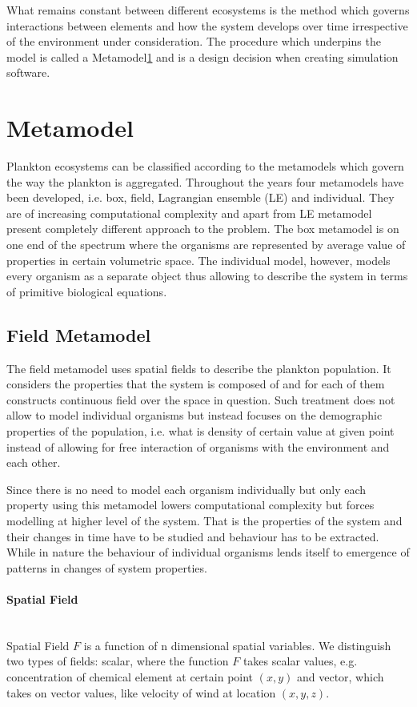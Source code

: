 \documentclass[12pt, a4paper]{report}
\newcommand{\myparagraph}[1]{\paragraph{#1}\mbox{}\\}
\begin{document}
What remains constant between different ecosystems is the method which governs interactions
between elements and how the system develops over time irrespective of the environment
under consideration. The procedure which underpins the model is called a Metamodel\ref{sec:meta}
and is a design decision when creating simulation software.

\section{Metamodel}\label{sec:meta}
Plankton ecosystems can be classified according to the metamodels which govern
the way the plankton is aggregated. Throughout the years four metamodels have
been developed, i.e. box, field, Lagrangian ensemble (LE) and individual. They
are of increasing computational complexity and apart from LE metamodel present
completely different approach to the problem. The box metamodel is on one end
of the spectrum where the organisms are represented by average value of
properties in certain volumetric space. The individual model, however,
models every organism as a separate object thus allowing to describe the system
in terms of primitive biological equations.

\subsection{Field Metamodel}\label{para:field-meta}
The field metamodel uses spatial fields to describe the plankton population.
It considers the properties that the system is composed of and for each
of them constructs continuous field over the space in question. Such
treatment does not allow to model individual organisms but instead
focuses on the demographic properties of the population, i.e. what is
density of certain value at given point instead of allowing for free
interaction of organisms with the environment and each other.

Since there is no need to model each organism individually but only
each property using this metamodel lowers computational complexity
but forces modelling at higher level of the system. That is the
properties of the system and their changes in time have to be studied
and behaviour has to be extracted. While in nature the behaviour of
individual organisms lends itself to emergence of patterns in changes
of system properties.

\myparagraph{Spatial Field}\label{par:field}
Spatial Field $F$ is a function of n dimensional spatial variables.
We distinguish two types of fields: scalar, where the function $F$
takes scalar values, e.g. concentration of chemical element at certain
point $(x,y)$ and vector, which takes on vector values, like
velocity of wind at location $(x,y,z)$.
\end{document}
